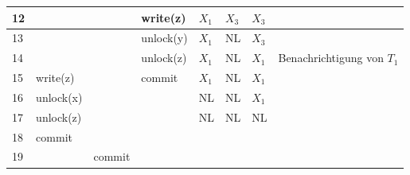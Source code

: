\documentclass[a4paper,11pt,fleqn]{scrartcl}
\begin{document}
\begin{enumerate}
\begin{tabular}{|p{2cm}|p{2cm}|p{2cm}|p{2cm}|p{1cm}|p{1cm}|p{1cm}|p{3cm}|}
				\hline
				12          &             &             & write(z)    & $X_1$ & $X_3$ & $X_3$ & \\
				\hline
				13          &             &             & unlock(y)   & $X_1$ & NL    & $X_3$ & \\
				\hline
				14          &             &             & unlock(z)   & $X_1$ & NL    & $X_1$ & Benachrichtigung von $T_1$\\
				\hline
				15          & write(z)    &             & commit      & $X_1$ & NL    & $X_1$ & \\
				\hline
				16          & unlock(x)   &             &             & NL    & NL    & $X_1$ & \\
				\hline
				17          & unlock(z)   &             &             & NL    & NL    & NL    & \\
				\hline
				18          & commit      &             &             &       &       &       & \\
				\hline
				19          &             & commit      &             &       &       &       & \\
				\hline
			\end{tabular}
	\end{enumerate}
\end{document}

